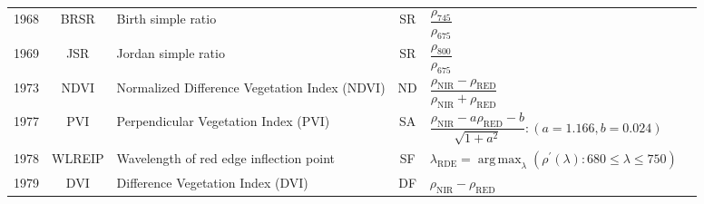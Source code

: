 \documentclass[10pt]{article}
\DeclareMathOperator{\argmax}{arg\,max}
\begin{document}
\begin{ThreePartTable}
\begin{longtable}{c c m{2.3in} c M{2.8in} M{1.5in}}
  1968 & BRSR    & Birth simple ratio                                                             & SR & $\dfrac{\rho_{745}}{\rho_{675}}$                                                                                                                                                                                                                                                        & \citet{Birth1968}                                   \\
  1969 & JSR     & Jordan simple ratio                                                            & SR & $\dfrac{\rho_{800}}{\rho_{675}}$                                                                                                                                                                                                                                                        & \citet{Jordan1969}                                  \\
  1973 & NDVI    & Normalized Difference Vegetation Index (NDVI)                                  & ND & $\dfrac{\rho_\text{NIR}-\rho_\text{RED}}{\rho_\text{NIR}+\rho_\text{RED}}$                                                                                                                                                                                                              & \citet{Rouse1973}                                   \\
  1977 & PVI     & Perpendicular Vegetation Index (PVI)                                           & SA & $\dfrac{\rho_\text{NIR}-a\rho_\text{RED}-b}{\sqrt{1+a^2}}:(a=1.166,b=0.024)$                                                                                                                                                                                                            & \citet{Richardson1977,Jackson1980,Huete1984}        \\
  1978 & WLREIP  & Wavelength of red edge inflection point                                        & SF & $\lambda_\text{RDE} = \argmax_\lambda (\rho^\prime(\lambda):680\le\lambda\le750)$                                                                                                                                                                                                       & \citet{Collins1978,Horler1983}                      \\
  1979 & DVI     & Difference Vegetation Index (DVI)                                              & DF & $\rho_\text{NIR}-\rho_\text{RED}$                                                                                                                                                                                                                                                       & \citet{Tucker1979}                                  \\

\end{longtable}
\end{ThreePartTable}
\end{document}
